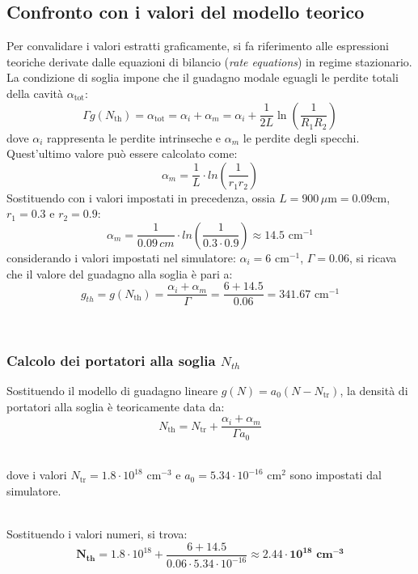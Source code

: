 \subsection{Confronto con i valori del modello teorico}
\noindent Per convalidare i valori estratti graficamente, si fa riferimento alle espressioni teoriche derivate dalle equazioni di bilancio (\textit{rate equations}) in regime stazionario. La condizione di soglia impone che il guadagno modale eguagli le perdite totali della cavità $\alpha_{\text{tot}}$:
\begin{equation}
\Gamma g(N_{\text{th}}) = \alpha_{\text{tot}} = \alpha_i + \alpha_m = \alpha_i + \frac{1}{2L} \ln\left(\frac{1}{R_1 R_2}\right)
\end{equation}
dove $\alpha_i$ rappresenta le perdite intrinseche e $\alpha_m$ le perdite degli specchi.
\noindent\\ Quest'ultimo valore può essere calcolato come:
\begin{equation}
    \alpha_m = \dfrac{1}{L} \cdot ln{\left(\dfrac{1}{r_1 r_2}\right)}
\end{equation}
\noindent Sostituendo con i valori impostati in precedenza, ossia $L = 900 \,\mu \text{m} = 0.09 \text{cm}$, $r_1 = 0.3$ e $r_2 = 0.9$:
\[
    \alpha_m = \dfrac{1}{0.09\,cm} \cdot ln{\left(\dfrac{1}{0.3\cdot 0.9}\right)} \approx 14.5 \text{ cm}^{-1}
\]
\noindent considerando i valori impostati nel simulatore: $\alpha_i = 6 \text{ cm}^{-1}$, $\Gamma = 0.06$, si ricava che il valore del guadagno alla soglia è pari a:
\[
    g_{th} = g(N_{\text{th}}) = \dfrac{\alpha_i + \alpha_m}{\Gamma} = \dfrac{6 + 14.5}{0.06} = 341.67 \text{ cm}^{-1}
\]

\noindent\\
\subsubsection{Calcolo dei portatori alla soglia $N_{th}$}
\noindent Sostituendo il modello di guadagno lineare $g(N) = a_0(N - N_{\text{tr}})$, la densità di portatori alla soglia è teoricamente data da:
\begin{equation}
N_{\text{th}} = N_{\text{tr}} + \dfrac{\alpha_i + \alpha_m}{\Gamma a_0}
\end{equation}

\noindent\\ dove i valori $N_{\text{tr}} = 1.8 \cdot 10^{18} \text{ cm}^{-3}$ e $a_0 = 5.34 \cdot 10^{-16} \text{ cm}^2$ sono impostati dal simulatore.

\noindent\\ Sostituendo i valori numeri, si trova:
\[
    \boldsymbol{N_{th}} = 1.8 \cdot 10^{18} + \dfrac{6 + 14.5}{0.06 \cdot 5.34 \cdot 10^{-16}} \approx \boldsymbol{2.44 \cdot 10^{18} \textbf{ cm}^{-3}}
\]

